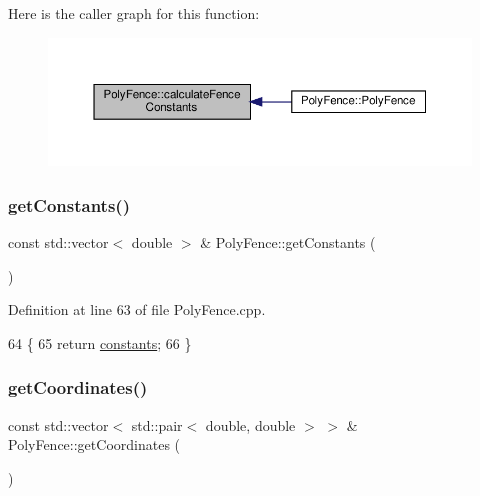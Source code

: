 Here is the caller graph for this function\+:
\nopagebreak
\begin{figure}[H]
\begin{center}
\leavevmode
\includegraphics[width=350pt]{d1/d22/class_poly_fence_a229de6f5987bf7d312310b522db0d5a4_icgraph}
\end{center}
\end{figure}
\mbox{\label{class_poly_fence_a8eb326a3ea522915ee2d343e838730d8}} 
\subsubsection{\texorpdfstring{get\+Constants()}{getConstants()}}
{\footnotesize\ttfamily const std\+::vector$<$ double $>$ \& Poly\+Fence\+::get\+Constants (\begin{DoxyParamCaption}{ }\end{DoxyParamCaption})}



Definition at line 63 of file Poly\+Fence.\+cpp.


\begin{DoxyCode}
64 \{
65     \textcolor{keywordflow}{return} \hyperlink{class_poly_fence_a24c99bb8a45f86bdf51cd3f22ef0f174}{constants};
66 \}
\end{DoxyCode}
\mbox{\label{class_poly_fence_ac21701adcb8af5b77872d7659318af72}} 
\subsubsection{\texorpdfstring{get\+Coordinates()}{getCoordinates()}}
{\footnotesize\ttfamily const std\+::vector$<$ std\+::pair$<$ double, double $>$ $>$ \& Poly\+Fence\+::get\+Coordinates (\begin{DoxyParamCaption}{ }\end{DoxyParamCaption})}



